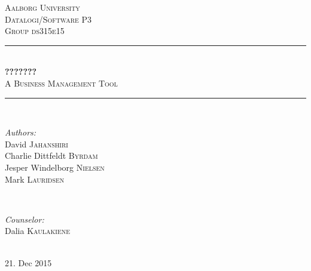%

\newcommand{\HRule}{\rule{\linewidth}{0.5mm}}

\thispagestyle{empty}

\begin{center} %


\textsc{\LARGE Aalborg University}\\[1.5cm] %
\textsc{\Large Datalogi/Software P3}\\[0.5cm] %
\textsc{\large Group ds315e15}\\[0.5cm] %


\HRule \\[0.4cm]
{ \huge \bfseries ???????}\\[0.5cm] %
\textsc{A Business Management Tool} %
\HRule \\[1.5cm]


\begin{minipage}{0.45\textwidth}
\begin{flushleft} \large
\emph{Authors:}\\
David \textsc{Jahanshiri} \\
Charlie Dittfeldt \textsc{Byrdam} \\
Jesper Windelborg \textsc{Nielsen} \\
Mark \textsc{Lauridsen} \\
\end{flushleft}
\end{minipage}
~
\begin{minipage}{0.4\textwidth}
\begin{flushright} \large
\emph{Counselor:} \\
Dalia \textsc{Kaulakiene} \\
\end{flushright}
\end{minipage}\\[4cm]

{\large 21. Dec 2015}\\[3cm]

\end{center}